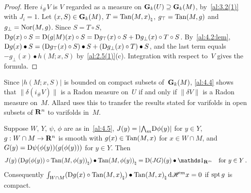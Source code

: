 \begin{proof}
    Here $i_\# V$ is $V$ regarded as a measure on $\mathbf{G}_{k}(U) \supseteq \mathbf{G}_{k}(M)$, by~\ref{al:3.2(1)}
    with $J_i = 1$. Let $(x,S) \in \mathbf{G}_{k}(M)$, $T = {\operatorname{Tan}(M,x)}_\natural$, $g_\top = \operatorname{Tan}(M,g)$ and
    $g_\perp = \operatorname{Nor}(M,g)$. Since $S = T \circ S$, $\mathrm{D} g(x) \circ S = \mathrm{D} (g|M)(x) \circ S = \mathrm{D}
    g_\top(x) \circ S + \mathrm{D} g_\perp(x) \circ T \circ S$. By~\ref{al:4.2:lem}, $\mathrm{D} g(x) \bullet S
    = (\mathrm{D} g_\top(x) \circ S) \bullet S + (\mathrm{D} g_\perp(x) \circ T) \bullet S$, and the last term
    equals $- g_\perp(x) \bullet h(M;x,S)$ by~\ref{al:2.5(1)}(c). Integration with respect to~$V$
    gives the formula.
\end{proof}

\begin{remark}
    \label{rem:4.4}
    Since $|h(M;x,S)|$ is bounded on compact subsets of~$\mathbf{G}_{k}(M)$, \ref{al:4.4} shows that
    $\|\delta(i_\# V)\|$ is a Radon measure on~$U$ if and only if $\|\delta V\|$ is a Radon measure
    on~$M$. Allard uses this to transfer the results stated for varifolds in open subsets of
    $\mathbf{R}^{n}$ to varifolds in~$M$.
\end{remark}

\begin{lemma}[new]
    \label{new:divergence}
    Suppose $W$, $Y$, $\psi$, $\phi$ are as in~\ref{al:4.5}, $J(y) = |{\textstyle\boldsymbol{\bigwedge}}_{{m}} \mathrm{D} \phi(y)|$
    for $y \in Y$, $g : W \cap M \to \mathbf{R}^{n}$ is smooth with $g(x) \in \operatorname{Tan}(M,x)$ for $x \in W
    \cap M$, and $G(y) = \mathrm{D} \psi(\phi(y))(g(\phi(y)))$ for $y \in Y$. Then
    \begin{displaymath}
        J(y) \, (\uD g(\phi(y)) \circ \project{\Tan(M,\phi(y))}) \bullet \project{\Tan(M,\phi(y))} =
        \uD (J G)(y) \bullet \id{\R^m} \quad \text{for $y \in Y$} \,.
    \end{displaymath}
    Consequently ${\textstyle\int_{W \cap M}^{}} (\mathrm{D} g(x) \circ {\operatorname{Tan}(M,x)}_\natural) \bullet
    {\operatorname{Tan}(M,x)}_\natural \,\mathrm{d} \mathscr{H}^m x = 0$ if $\operatorname{spt} g$ is compact.
\end{lemma}

